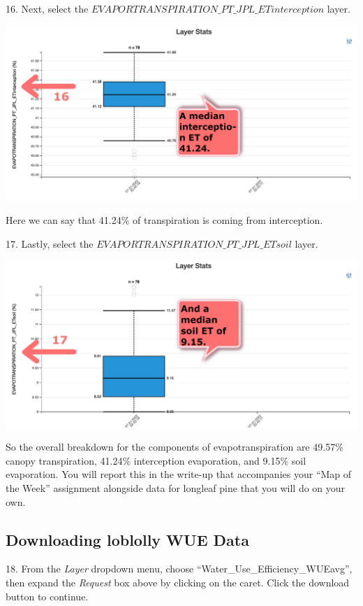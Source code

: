 \documentclass[oneside,a4paper,11pt,explicit]{book}
\begin{document}
16. Next, select the $EVAPORTRANSPIRATION\_PT\_JPL\_ETinterception$ layer. 

\vspace{.5em}

\centerline{\includegraphics[width=.6\textwidth]{ETComponents2.png}}

\vspace{.5em}

Here we can say that 41.24\% of transpiration is coming from interception.

17. Lastly, select the $EVAPORTRANSPIRATION\_PT\_JPL\_ETsoil$ layer.

\vspace{.5em}

\centerline{\includegraphics[width=.6\textwidth]{ETComponents3.png}}

\vspace{.5em}

So the overall breakdown for the components of evapotranspiration are 49.57\% canopy transpiration, 41.24\% interception evaporation, and 9.15\% soil evaporation. You will report this in the write-up that accompanies your ``Map of the Week'' assignment alongside data for longleaf pine that you will do on your own. 

\subsection{Downloading loblolly WUE Data}

18. From the \textit{Layer} dropdown menu, choose ``Water\_Use\_Efficiency\_WUEavg'', then expand the \textit{Request} box above by clicking on the caret. Click the download button to continue.
\end{document}
